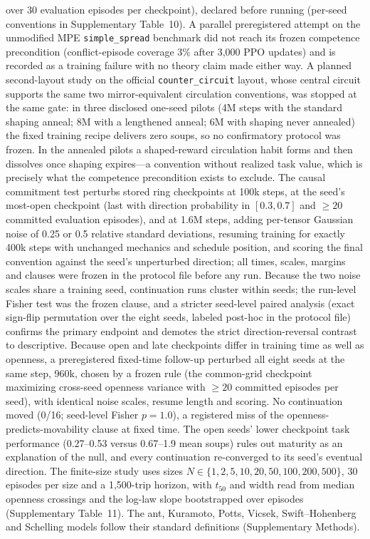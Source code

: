 \documentclass[11pt]{article}
\begin{document}
over 30 evaluation episodes per checkpoint), declared before running
(per-seed conventions in Supplementary Table~10).
A parallel preregistered attempt on the unmodified MPE
\texttt{simple\_spread} benchmark did not reach its frozen competence
precondition (conflict-episode coverage 3\% after 3{,}000 PPO updates)
and is recorded as a training failure with no theory claim made either
way. A planned second-layout study on the official
\texttt{counter\_circuit} layout, whose central circuit supports the
same two mirror-equivalent circulation conventions, was stopped at
the same gate: in three disclosed one-seed pilots (4M steps with the
standard shaping anneal; 8M with a lengthened anneal; 6M with shaping
never annealed) the fixed training recipe delivers zero soups, so no
confirmatory protocol was frozen. In the annealed pilots a
shaped-reward circulation habit forms and then dissolves once shaping
expires---a convention without realized task value, which is
precisely what the competence precondition exists to exclude. The causal commitment test perturbs stored ring checkpoints at
100k steps, at the seed's most-open checkpoint (last with direction
probability in $[0.3,0.7]$ and $\geq 20$ committed evaluation
episodes), and at 1.6M steps, adding per-tensor Gaussian noise of 0.25
or 0.5 relative standard deviations, resuming training for exactly
400k steps with unchanged mechanics and schedule position, and scoring
the final convention against the seed's unperturbed direction; all
times, scales, margins and clauses were frozen in the protocol file
before any run. Because the two noise scales share a training seed,
continuation runs cluster within seeds; the run-level Fisher test was
the frozen clause, and a stricter seed-level paired analysis (exact
sign-flip permutation over the eight seeds, labeled post-hoc in the
protocol file) confirms the primary endpoint and demotes the strict
direction-reversal contrast to descriptive. Because open and late
checkpoints differ in training time as well as openness, a
preregistered fixed-time follow-up perturbed all eight seeds at the
same step, 960k, chosen by a frozen rule (the common-grid checkpoint
maximizing cross-seed openness variance with $\geq 20$ committed
episodes per seed), with identical noise scales, resume length and
scoring. No continuation moved (0/16; seed-level Fisher $p=1.0$), a
registered miss of the openness-predicts-movability clause at fixed
time. The open seeds' lower checkpoint task performance (0.27--0.53
versus 0.67--1.9 mean soups) rules out maturity as an explanation of
the null, and every continuation re-converged to its seed's eventual
direction. The finite-size study uses sizes
$N\in\{1,2,5,10,20,50,100,200,500\}$, 30 episodes per size and a
1{,}500-trip horizon, with $t_{50}$ and width read from median
openness crossings and the log-law slope bootstrapped over episodes
(Supplementary Table~11).
The ant, Kuramoto, Potts, Vicsek, Swift--Hohenberg and Schelling models
follow their standard definitions (Supplementary Methods).
\end{document}

